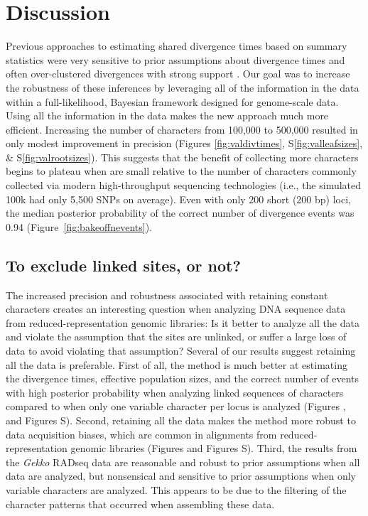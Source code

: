 \section{Discussion}

Previous approaches to estimating shared divergence times based on summary
statistics were very sensitive to prior assumptions about divergence times and
often over-clustered divergences with strong support
\citep{Oaks2012,Hickerson2013,Oaks2014reply,Oaks2014dpp}.
Our goal was to increase the robustness of these inferences by leveraging all
of the information in the data within a full-likelihood, Bayesian framework
designed for genome-scale data.
Using all the information in the data makes the new approach much
more efficient.
Increasing the number of characters from 100,000 to 500,000 resulted
in only modest improvement in precision
(Figures
\ref{fig:valdivtimes}, S\ref{fig:valleafsizes}, \& S\ref{fig:valrootsizes}).
This suggests that the benefit of collecting more characters begins to plateau
when \datasets are small relative to the number of characters commonly
collected via modern high-throughput sequencing technologies (i.e., the
simulated 100k \datasets had only 5,500 SNPs on average).
Even with only 200 short (200 bp) loci, the median posterior probability
of the correct number of divergence events was 0.94
(Figure~\ref{fig:bakeoffnevents}).


\subsection{To exclude linked sites, or not?}

The increased precision and robustness associated with retaining constant
characters creates an interesting question when analyzing DNA sequence data
from reduced-representation genomic libraries:
Is it better to analyze all the data and violate the assumption that the sites
are unlinked, or suffer a large loss of data to avoid violating that
assumption?
Several of our results suggest retaining all the data is preferable.
First of all, the method is much better at estimating the divergence times,
effective population sizes, and the correct number of events with high
posterior probability when analyzing linked sequences of characters compared to
when only one variable character per locus is analyzed
(Figures
,
and
Figures
S).
Second, retaining all the data makes the method more robust to data acquisition
biases, which are common in alignments from reduced-representation genomic
libraries
(Figures
and
Figures
S).
Third, the results from the \emph{Gekko} RADseq data are
reasonable and robust to prior assumptions when all data are analyzed,
but nonsensical and sensitive to prior assumptions when only variable
characters are analyzed.
This appears to be due to the filtering of the character patterns that occurred
when assembling these data.

